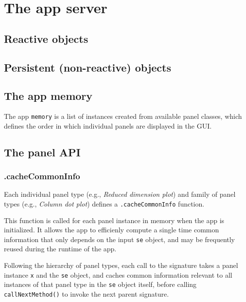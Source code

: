 \documentclass[]{book}
\begin{document}
\hypertarget{server}{%
\chapter{The app server}\label{server}}

\hypertarget{robjects}{%
\section{Reactive objects}\label{robjects}}

\hypertarget{persistent-non-reactive-objects}{%
\section{Persistent (non-reactive) objects}\label{persistent-non-reactive-objects}}

\hypertarget{memory}{%
\section{The app memory}\label{memory}}

The app \texttt{memory} is a list of instances created from available panel classes, which defines the order in which individual panels are displayed in the GUI.

\hypertarget{panel-api}{%
\section{The panel API}\label{panel-api}}

\hypertarget{cachecommoninfo}{%
\subsection{.cacheCommonInfo}\label{cachecommoninfo}}

Each individual panel type (e.g., \emph{Reduced dimension plot}) and family of panel types (e.g., \emph{Column dot plot}) defines a \texttt{.cacheCommonInfo} function.

This function is called for each panel instance in memory when the app is initialized.
It allows the app to efficienly compute a single time common information that only depends on the input \texttt{se} object, and may be frequently reused during the runtime of the app.

Following the hierarchy of panel types, each call to the signature takes a panel instance \texttt{x} and the \texttt{se} object, and caches common information relevant to all instances of that panel type in the \texttt{se} object itself, before calling \texttt{callNextMethod()} to invoke the next parent signature.
\end{document}
